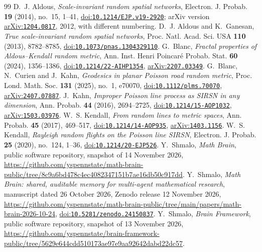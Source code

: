 \documentclass[11pt]{amsart}
\theoremstyle{remark}
\newcommand{\doi}[1]{\href{https://doi.org/#1}{doi:\nolinkurl{#1}}}
\newcommand{\arxiv}[1]{\href{https://arxiv.org/abs/#1}{arXiv:\nolinkurl{#1}}}
\begin{document}
\begin{thebibliography}{99}
 D.~J. Aldous, \emph{Scale-invariant random spatial networks}, Electron. J. Probab. \textbf{19} (2014),
no.~15, 1--41, \doi{10.1214/EJP.v19-2920}; arXiv version \arxiv{1204.0817}, 2012, with different numbering.
 D.~J. Aldous and K.~Ganesan, \emph{True scale-invariant random spatial networks}, Proc. Natl. Acad. Sci.
USA \textbf{110} (2013), 8782--8785, \doi{10.1073/pnas.1304329110}.
 G.~Blanc, \emph{Fractal properties of Aldous--Kendall random metric}, Ann. Inst. Henri Poincar\'e
Probab. Stat. \textbf{60} (2024), 1356--1386, \doi{10.1214/22-AIHP1354}, \arxiv{2207.03349}.
 G.~Blanc, N.~Curien and J.~Kahn, \emph{Geodesics in planar Poisson road random metric}, Proc. Lond.
Math. Soc. \textbf{131} (2025), no.~1, e70070, \doi{10.1112/plms.70070}, \arxiv{2407.07887}.
 J.~Kahn, \emph{Improper Poisson line process as SIRSN in any dimension}, Ann. Probab. \textbf{44}
(2016), 2694--2725, \doi{10.1214/15-AOP1032}, \arxiv{1503.03976}.
 W.~S. Kendall, \emph{From random lines to metric spaces}, Ann. Probab. \textbf{45} (2017), 469--517,
\doi{10.1214/14-AOP935}, \arxiv{1403.1156}.
 W.~S. Kendall, \emph{Rayleigh random flights on the Poisson line SIRSN}, Electron. J. Probab.
\textbf{25} (2020), no.~124, 1--36, \doi{10.1214/20-EJP526}.
 Y.~Shmalo, \emph{Math Brain}, public software repository, snapshot of 14 November 2026,
\url{https://github.com/yspennstate/math-brain-public/tree/8c9a6bd478c4ec4082347151b7ae16db50c917dd}.
 Y.~Shmalo, \emph{Math Brain: shared, auditable memory for multi-agent mathematical research},
manuscript dated 26 October 2026, Zenodo release 12 November 2026,
\url{https://github.com/yspennstate/math-brain-public/tree/main/papers/math-brain-2026-10-24},
\doi{10.5281/zenodo.24150837}.
 Y.~Shmalo, \emph{Brain Framework}, public software repository, snapshot of 13 November 2026,
\url{https://github.com/yspennstate/brain-framework-public/tree/5629e644cdd510173ae97e9aa92642dabd22dc57}.
\end{thebibliography}
\end{document}
